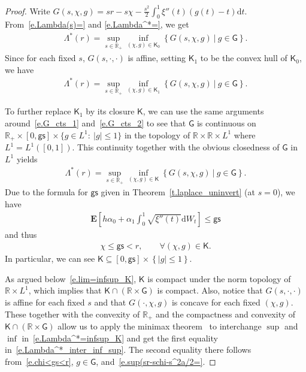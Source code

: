 \documentclass[11pt]{amsart}
\theoremstyle{remark}
\theoremstyle{definition}
\numberwithin{equation}{section}
\numberwithin{proposition}{section}
\numberwithin{figure}{section}
\numberwithin{table}{section}
\newcommand{\R}{\mathbb{R}}
\newcommand{\EE}{\mathbf{E}}
\renewcommand{\leq}{\leqslant}
\renewcommand{\subset}{\subseteq}
\newcommand{\Ll}{\left}
\newcommand{\Rr}{\right}
\renewcommand{\d}{\mathrm{d}}
\newcommand{\1}{\mathbf{1}}
\newcommand{\msf}{\mathsf}
\newcommand{\gs}{\msf {gs}}
\begin{document}
\begin{proof}
Write $G(s,\chi,g) = sr - s\chi -\frac{s^2}{2}\int_0^1 \xi''(t)\Ll(g(t) -t \Rr)\d t$.
From~\eqref{e.Lambda(s)=} and \eqref{e.Lambda^*=}, we get
\begin{align*}
    \Lambda^*(r) = \sup_{s\in\R_+}\inf_{(\chi,g)\in\msf K_0}\Ll\{ G(s,\chi,g)\ \big|\ g\in\msf G\Rr\}.
\end{align*}
Since for each fixed $s$, $G(s,\cdot,\cdot)$ is affine, setting $\msf K_1$ to be the convex hull of $\msf K_0$, we have
\begin{align*}%
    \Lambda^*(r) = \sup_{s\in\R_+}\inf_{(\chi,g)\in\msf K_1}\Ll\{ G(s,\chi,g)\ \big|\ g\in\msf G\Rr\}.
\end{align*}


To further replace $\msf K_1$ by its closure $\msf K$, we can use the same arguments around~\eqref{e.G_cts_1} and~\eqref{e.G_cts_2} to see that $\msf G$ is continuous on $\R_+\times[0,\gs] \times \{g\in L^1:\:|g|\leq 1\}$ in the topology of $\R\times\R\times L^1$ where $L^1 =L^1([0,1])$. This continuity together with the obvious closedness of $\msf G$ in $L^1$ yields
\begin{align}\label{e.Lambda^*=infsup_K}
    \Lambda^*(r) = \sup_{s\in\R_+}\inf_{(\chi,g)\in\msf K}\Ll\{ G(s,\chi,g)\ \big|\ g\in\msf G\Rr\}.
\end{align}
Due to the formula for $\gs$ given in Theorem~\ref{t.laplace_uninvert} (at $s=0$), we have
\begin{align}\label{e.E[..alpha..]<gs}
    \EE\Ll[h\alpha_0 + \alpha_1\int_0^1\sqrt{\xi''(t)}\d W_t\Rr] \leq \gs 
\end{align}
and thus
\begin{align}\label{e.chi<gs<r}
    \chi \leq \gs < r,\qquad \forall (\chi,g)\in \msf K.
\end{align}
In particular, we can see $\msf K\subset [0,\gs]\times \Ll\{|g|\leq 1\Rr\}$.

As argued below~\eqref{e.lim=infsup_K}, $\msf K$ is compact under the norm topology of $\R\times L^1$, which implies that $\msf K\cap (\R\times \msf G)$ is compact. Also, notice that $G(s,\cdot,\cdot)$ is affine for each fixed $s$ and that $G(\cdot,\chi,g)$ is concave for each fixed $(\chi,g)$. These together with the convexity of $\R_+$ and the compactness and convexity of $\msf K\cap (\R\times \msf G)$ allow us to apply the minimax theorem~\cite{fan1953minimax,sion1958minimax} to interchange $\sup$ and $\inf$ in~\eqref{e.Lambda^*=infsup_K} and get the first equality in~\eqref{e.Lambda^*_inter_inf_sup}. The second equality there follows from~\eqref{e.chi<gs<r}, $g\in\msf G$, and~\eqref{e.sup(sr-schi-s^2a/2=}.
\end{proof}
\end{document}
